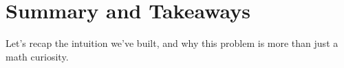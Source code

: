 \section{Summary and Takeaways}

Let’s recap the intuition we’ve built, and why this problem is more than just a math curiosity.